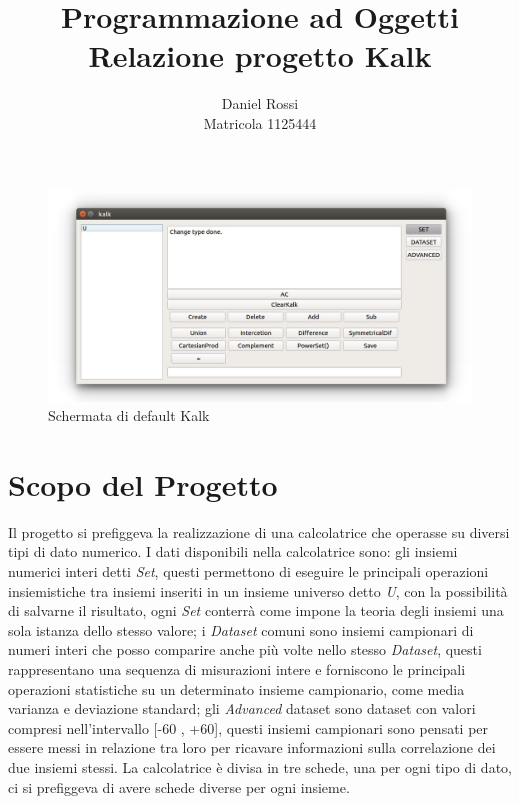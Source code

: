 \documentclass[a4paper,10pt]{article}
\begin{document}
        
        \title{Programmazione ad Oggetti\\Relazione progetto Kalk}
        \author{Daniel Rossi\\Matricola 1125444}
        \date{}
        \maketitle
        \begin{figure}[!h]
            \includegraphics[scale=0.5]{img/kalk.jpg}
                \caption{Schermata di default Kalk}
        \end{figure}
        \newpage
        \tableofcontents
        \newpage
        
        \section{Scopo del Progetto}
        Il progetto si prefiggeva la realizzazione di una calcolatrice che operasse su diversi tipi di dato numerico. I dati disponibili nella calcolatrice sono: gli insiemi numerici interi detti \textit{Set}, questi permettono di eseguire le principali operazioni insiemistiche tra insiemi inseriti in un insieme universo detto \textit{U}, con la possibilità di salvarne il risultato, ogni \textit{Set} conterrà come impone la teoria degli insiemi una sola istanza dello stesso valore; i \textit{Dataset} comuni sono insiemi campionari di numeri interi che posso comparire anche più volte nello stesso \textit{Dataset}, questi rappresentano una sequenza di misurazioni intere e forniscono le principali operazioni statistiche su un determinato insieme campionario, come media varianza e deviazione standard; gli \textit{Advanced} dataset sono dataset con valori compresi nell’intervallo [-60 , +60], questi insiemi campionari sono pensati per essere messi in relazione tra loro per ricavare informazioni sulla correlazione dei due insiemi stessi. La calcolatrice è divisa in tre schede, una per ogni tipo di dato, ci si prefiggeva di avere schede diverse per ogni insieme.
    
\end{document}

